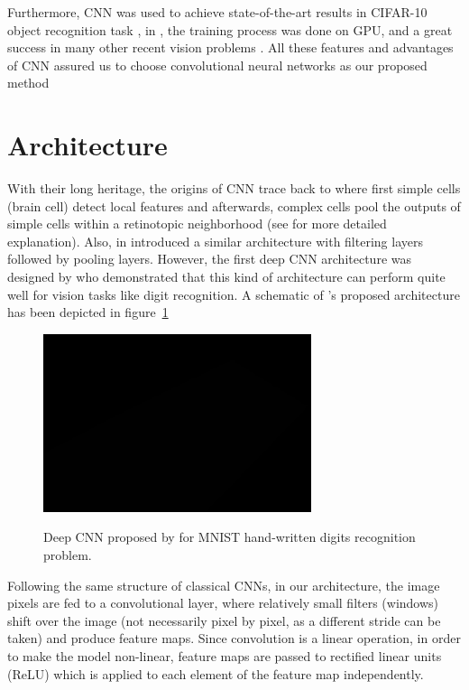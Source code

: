 Furthermore, CNN was used to achieve state-of-the-art results in CIFAR-10 object recognition task \cite{cirecsan2012multi}, in \cite{russakovsky2015imagenet}, the training process was done on GPU, and a great success in many other recent vision problems \cite{cirecsan2011convolutional, ciresan2015multi, wan2013regularization}. All these features and advantages of CNN assured us to choose convolutional neural networks as our proposed method

\section{Architecture}

With their long heritage, the origins of CNN trace back to \cite{hubel1962receptive} where first simple cells (brain cell) detect local features and afterwards, complex cells pool the outputs of simple cells within a retinotopic neighborhood (see \cite{hubel1962receptive} for more detailed explanation). Also, \citeauthor*{fukushima1975cognitron} in \cite{fukushima1975cognitron, fukushima1980neocognitron} introduced a similar architecture with filtering layers followed by pooling layers. However, the first deep CNN architecture was designed by \citealt{lecun1989backpropagation} who demonstrated that this kind of architecture can perform quite well for vision tasks like digit recognition. A schematic of \citeauthor{lecun1989backpropagation}'s proposed architecture has been depicted in figure~\ref{fig:lecun}

\begin{figure}[H]
	\centering
	{\includegraphics[width=0.7\textwidth]{images/1}}
	\caption{Deep CNN proposed by \citeauthor{lecun1989backpropagation} for MNIST hand-written digits recognition problem.}
	\label{fig:lecun}
\end{figure}

Following the same structure of classical CNNs, in our architecture, the image pixels are fed to a convolutional layer, where relatively small filters (windows) shift over the image (not necessarily pixel by pixel, as a different stride can be taken) and produce feature maps. Since convolution is a linear operation, in order to make the model non-linear, feature maps are passed to rectified linear units (ReLU) \cite{nair2010rectified} which is applied to each element of the feature map independently. 

